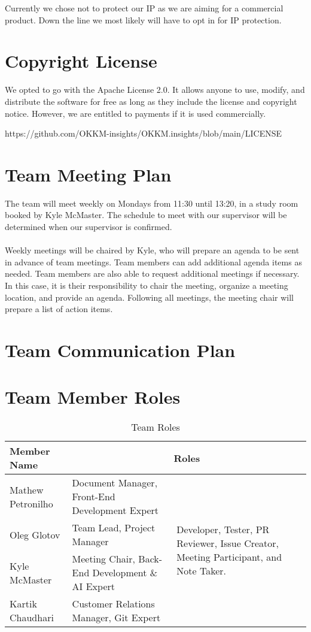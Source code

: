 \documentclass{article}
\begin{document}
Currently we chose not to protect our IP as we are aiming for a commercial product. Down the line we most likely will have to opt in for IP protection.

\section{Copyright License}

We opted to go with the Apache License 2.0. It allows anyone to use, modify, and distribute the software for free as long as they include the license and copyright notice. However, we are entitled to payments if it is used commercially.

https://github.com/OKKM-insights/OKKM.insights/blob/main/LICENSE

\section{Team Meeting Plan}
The team will meet weekly on Mondays from 11:30 until 13:20, in a study room booked by Kyle McMaster.
The schedule to meet with our supervisor will be determined when our supervisor is confirmed.\\\\
Weekly meetings will be chaired by Kyle, who will prepare an agenda to be sent in advance of team meetings. Team members can add additional agenda items as
needed. Team members are also able to request additional meetings if necessary. In this case, it is their responsibility to chair the meeting, 
organize a meeting location, and provide an agenda. Following all meetings, the meeting chair will prepare a list of action items.

\section{Team Communication Plan}


\section{Team Member Roles}
\begin{table}[H]
  \centering
  \begin{tabular}{|p{3cm}|p{6cm}|p{3cm}|}
    \hline
    \textbf{Member Name} & \multicolumn{2}{c|}{\textbf{Roles}} \\
    \hline
    Mathew Petronilho  & Document Manager, Front-End Development Expert & \multirow{4}{*}{\parbox{3cm}{Developer, Tester, PR Reviewer, Issue Creator, Meeting Participant, and Note Taker.}}\\
    \cline{1-2} 
    Oleg Glotov & Team Lead, Project Manager & \\
    \cline{1-2} 
    Kyle McMaster & Meeting Chair, Back-End Development \& AI Expert  & \\
    \cline{1-2}
    Kartik Chaudhari & Customer Relations Manager, Git Expert & \\
    \hline
  \end{tabular}
  \caption{Team Roles}
\end{table}
\end{document}
